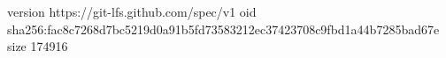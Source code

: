 version https://git-lfs.github.com/spec/v1
oid sha256:fac8c7268d7bc5219d0a91b5fd73583212ec37423708c9fbd1a44b7285bad67e
size 174916
